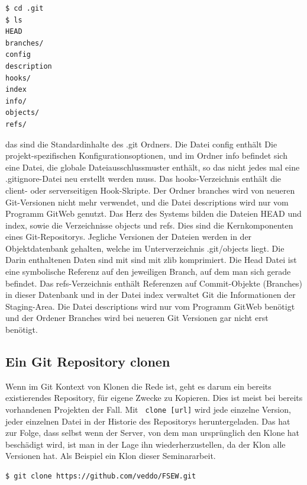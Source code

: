 \documentclass[12pt,a4paper,bibliography=totocnumbered,listof=totocnumbered]{scrartcl}
\begin{document}
\begin{lstlisting}
$ cd .git
$ ls
HEAD
branches/
config
description
hooks/
index
info/
objects/
refs/
\end{lstlisting}

das sind die Standardinhalte des .git Ordners. Die Datei config enthält Die projekt-spezifischen Konfigurationsoptionen, und im Ordner info befindet sich eine Datei, die globale Dateiausschlussmuster enthält, so das nicht jedes mal eine  .gitignore-Datei neu erstellt werden muss. Das hooks-Verzeichnis enthält die client- oder serverseitigen Hook-Skripte.
Der Ordner branches wird von neueren Git-Versionen nicht mehr verwendet, und die Datei descriptions wird nur vom Programm GitWeb genutzt. Das Herz des Systems  bilden die Dateien HEAD und index, sowie die Verzeichnisse objects und refs. Dies sind die Kernkomponenten eines Git-Repositorys. Jegliche Versionen der Dateien werden in der Objektdatenbank gehalten, welche im Unterverzeichnis .git/objects liegt. Die Darin enthaltenen Daten sind mit sind mit zlib komprimiert. Die Head Datei  ist eine symbolische Referenz auf den jeweiligen Branch, auf dem man sich gerade befindet.	Das refs-Verzeichnis enthält Referenzen auf Commit-Objekte (Branches) in dieser Datenbank und in der Datei index verwaltet Git die Informationen der Staging-Area. Die Datei 	descriptions wird nur vom Programm GitWeb benötigt und der Ordener Branches wird bei neueren Git Versionen gar nicht erst benötigt.
	





\subsection{Ein Git Repository clonen}
Wenn im Git Kontext von Klonen die Rede ist, geht es darum ein bereits existierendes Repository, für eigene Zwecke zu Kopieren. Dies ist meist bei bereits vorhandenen Projekten der Fall. Mit \lstinline| clone [url]| wird jede einzelne Version, jeder einzelnen Datei in der Historie des Repositorys heruntergeladen. Das hat zur Folge, dass selbst wenn der Server, von dem man ursprünglich den Klone hat beschädigt wird, ist man in der Lage ihn wiederherzustellen, da der Klon alle Versionen hat. Als Beispiel ein Klon dieser Seminararbeit.

\vspace{1em}
\begin{lstlisting}[caption=Git Repository Klonen, label=lst:arduino]
$ git clone https://github.com/veddo/FSEW.git
\end{lstlisting}
\end{document}
